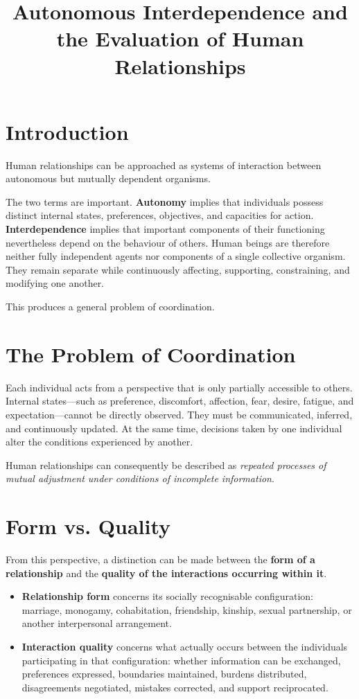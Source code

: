 \documentclass[11pt, a4paper]{article}
\title{Autonomous Interdependence and the Evaluation of Human Relationships}
\author{}
\date{}
\begin{document}
\maketitle

\section*{Introduction}
Human relationships can be approached as systems of interaction between autonomous but mutually dependent organisms.

The two terms are important. \textbf{Autonomy} implies that individuals possess distinct internal states, preferences, objectives, and capacities for action. \textbf{Interdependence} implies that important components of their functioning nevertheless depend on the behaviour of others. Human beings are therefore neither fully independent agents nor components of a single collective organism. They remain separate while continuously affecting, supporting, constraining, and modifying one another.

This produces a general problem of coordination.

\section*{The Problem of Coordination}
Each individual acts from a perspective that is only partially accessible to others. Internal states—such as preference, discomfort, affection, fear, desire, fatigue, and expectation—cannot be directly observed. They must be communicated, inferred, and continuously updated. At the same time, decisions taken by one individual alter the conditions experienced by another.

Human relationships can consequently be described as \emph{repeated processes of mutual adjustment under conditions of incomplete information}.

\section*{Form vs. Quality}
From this perspective, a distinction can be made between the \textbf{form of a relationship} and the \textbf{quality of the interactions occurring within it}.

\begin{itemize}[leftmargin=*]
    \item \textbf{Relationship form} concerns its socially recognisable configuration: marriage, monogamy, cohabitation, friendship, kinship, sexual partnership, or another interpersonal arrangement.
    \item \textbf{Interaction quality} concerns what actually occurs between the individuals participating in that configuration: whether information can be exchanged, preferences expressed, boundaries maintained, burdens distributed, disagreements negotiated, mistakes corrected, and support reciprocated.
\end{itemize}
\end{document}
